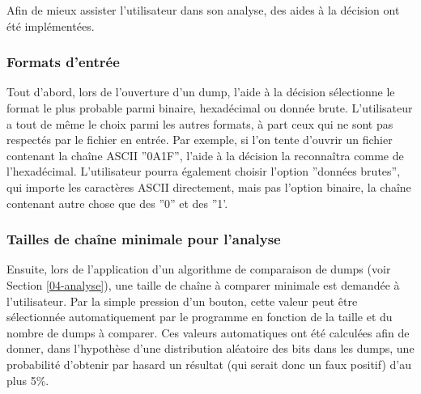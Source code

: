 Afin de mieux assister l'utilisateur dans son analyse, des aides à la décision ont été implémentées.

\subsubsection{Formats d'entrée}

Tout d'abord, lors de l'ouverture d'un dump, l'aide à la décision sélectionne le format le plus probable parmi binaire, hexadécimal ou donnée brute. L'utilisateur a tout de même le choix parmi les autres formats, à part ceux qui ne sont pas respectés par le fichier en entrée.
Par exemple, si l'on tente d'ouvrir un fichier contenant la chaîne ASCII ''0A1F'', l'aide à la décision la reconnaîtra comme de l'hexadécimal. L'utilisateur pourra également choisir l'option ''données brutes'', qui importe les caractères ASCII directement, mais pas l'option binaire, la chaîne contenant autre chose que des ''0'' et des ''1'.

\subsubsection{Tailles de chaîne minimale pour l'analyse}

Ensuite, lors de l'application d'un algorithme de comparaison de dumps (voir Section \ref{04-analyse}), une taille de chaîne à comparer minimale est demandée à l'utilisateur. Par la simple pression d'un bouton, cette valeur peut être sélectionnée automatiquement par le programme en fonction de la taille et du nombre de dumps à comparer.
Ces valeurs automatiques ont été calculées afin de donner, dans l'hypothèse d'une distribution aléatoire des bits dans les dumps, une probabilité d'obtenir par hasard un résultat (qui serait donc un faux positif) d'au plus 5\%.
